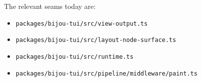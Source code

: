 The relevant seams today are:

\begin{itemize}
\tightlist
\item
  \texttt{p\allowbreak{}a\allowbreak{}c\allowbreak{}k\allowbreak{}a\allowbreak{}g\allowbreak{}e\allowbreak{}s\allowbreak{}/\allowbreak{}b\allowbreak{}i\allowbreak{}j\allowbreak{}o\allowbreak{}u\allowbreak{}-\allowbreak{}t\allowbreak{}u\allowbreak{}i\allowbreak{}/\allowbreak{}s\allowbreak{}r\allowbreak{}c\allowbreak{}/\allowbreak{}v\allowbreak{}i\allowbreak{}e\allowbreak{}w\allowbreak{}-\allowbreak{}o\allowbreak{}u\allowbreak{}t\allowbreak{}p\allowbreak{}u\allowbreak{}t\allowbreak{}.\allowbreak{}t\allowbreak{}s}
\item
  \texttt{p\allowbreak{}a\allowbreak{}c\allowbreak{}k\allowbreak{}a\allowbreak{}g\allowbreak{}e\allowbreak{}s\allowbreak{}/\allowbreak{}b\allowbreak{}i\allowbreak{}j\allowbreak{}o\allowbreak{}u\allowbreak{}-\allowbreak{}t\allowbreak{}u\allowbreak{}i\allowbreak{}/\allowbreak{}s\allowbreak{}r\allowbreak{}c\allowbreak{}/\allowbreak{}l\allowbreak{}a\allowbreak{}y\allowbreak{}o\allowbreak{}u\allowbreak{}t\allowbreak{}-\allowbreak{}n\allowbreak{}o\allowbreak{}d\allowbreak{}e\allowbreak{}-\allowbreak{}s\allowbreak{}u\allowbreak{}r\allowbreak{}f\allowbreak{}a\allowbreak{}c\allowbreak{}e\allowbreak{}.\allowbreak{}t\allowbreak{}s}
\item
  \texttt{p\allowbreak{}a\allowbreak{}c\allowbreak{}k\allowbreak{}a\allowbreak{}g\allowbreak{}e\allowbreak{}s\allowbreak{}/\allowbreak{}b\allowbreak{}i\allowbreak{}j\allowbreak{}o\allowbreak{}u\allowbreak{}-\allowbreak{}t\allowbreak{}u\allowbreak{}i\allowbreak{}/\allowbreak{}s\allowbreak{}r\allowbreak{}c\allowbreak{}/\allowbreak{}r\allowbreak{}u\allowbreak{}n\allowbreak{}t\allowbreak{}i\allowbreak{}m\allowbreak{}e\allowbreak{}.\allowbreak{}t\allowbreak{}s}
\item
  \texttt{p\allowbreak{}a\allowbreak{}c\allowbreak{}k\allowbreak{}a\allowbreak{}g\allowbreak{}e\allowbreak{}s\allowbreak{}/\allowbreak{}b\allowbreak{}i\allowbreak{}j\allowbreak{}o\allowbreak{}u\allowbreak{}-\allowbreak{}t\allowbreak{}u\allowbreak{}i\allowbreak{}/\allowbreak{}s\allowbreak{}r\allowbreak{}c\allowbreak{}/\allowbreak{}p\allowbreak{}i\allowbreak{}p\allowbreak{}e\allowbreak{}l\allowbreak{}i\allowbreak{}n\allowbreak{}e\allowbreak{}/\allowbreak{}m\allowbreak{}i\allowbreak{}d\allowbreak{}d\allowbreak{}l\allowbreak{}e\allowbreak{}w\allowbreak{}a\allowbreak{}r\allowbreak{}e\allowbreak{}/\allowbreak{}p\allowbreak{}a\allowbreak{}i\allowbreak{}n\allowbreak{}t\allowbreak{}.\allowbreak{}t\allowbreak{}s}
\end{itemize}

